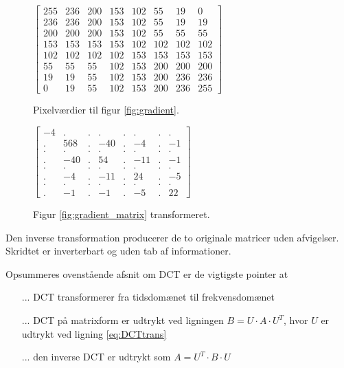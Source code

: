 \begin{figure}[htbp]
\begin{minipage}[b]{0.45\linewidth}
\centering
$\begin{bmatrix}
255	&	236	&	200	&	153	&	102	&	55	&	19	&	0\\
236	&	236	&	200	&	153	&	102	&	55	&	19	&	19\\
200	&	200	&	200	&	153	&	102	&	55	&	55	&	55\\
153	&	153	&	153	&	153	&	102	&	102	&	102	&	102\\
102	&	102	&	102	&	102	&	153	&	153	&	153	&	153\\
55	&	55	&	55	&	102	&	153	&	200	&	200	&	200\\
19	&	19	&	55	&	102	&	153	&	200	&	236	&	236\\
0	&	19	&	55	&	102	&	153	&	200	&	236	&	255
\end{bmatrix}$
\caption{Pixelværdier til figur \ref{fig:gradient}.\label{fig:gradient_matrix}}
\end{minipage}
\hspace{1.0cm}
\begin{minipage}[b]{0.45\linewidth}
\centering
$\begin{bmatrix}
-4	&	.	&	.	&	.	&	.	&	.	&	.	&	.	\\
.	&	568	&	.	&	-40	&	.	&	-4	&	.	&	-1	\\
.	&	.	&	.	&	.	&	.	&	.	&	.	&	.	\\
.	&	-40	&	.	&	54	&	.	&	-11	&	.	&	-1	\\
.	&	.	&	.	&	.	&	.	&	.	&	.	&	.	\\
.	&	-4	&	.	&	-11	&	.	&	24	&	.	&	-5	\\
.	&	.	&	.	&	.	&	.	&	.	&	.	&	.	\\
.	&	-1	&	.	&	-1	&	.	&	-5	&	.	&	22
\end{bmatrix}$
\caption{Figur \ref{fig:gradient_matrix} transformeret.\label{fig:trans_matrix3}}
\end{minipage}
\end{figure}
Den inverse transformation producerer de to originale matricer uden afvigelser. Skridtet er inverterbart og uden tab af informationer.

Opsummeres ovenstående afsnit om DCT er de vigtigste pointer at
\begin{itemize}
\item[...] DCT transformerer fra tidsdomænet til frekvensdomænet
\item[...] DCT på matrixform er udtrykt ved ligningen $B=U \cdot A \cdot U^T$, hvor $U$ er udtrykt ved ligning \vref{eq:DCTtrans}
\item[...] den inverse DCT er udtrykt som $A = U^T \cdot B \cdot U$ 
\end{itemize}

